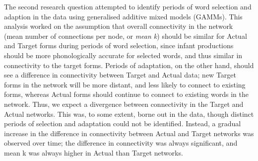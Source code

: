 \documentclass[
  man]{apa6}
\begin{document}
The second research question attempted to identify periods of word selection and adaption in the data using generalised additive mixed models (GAMMs). This analysis worked on the assumption that overall connectivity in the network (mean number of connections per node, or \emph{mean k}) should be similar for Actual and Target forms during periods of word selection, since infant productions should be more phonologically accurate for selected words, and thus similar in connectivity to the target forms. Periods of adaptation, on the other hand, should see a difference in connectivity between Target and Actual data; new Target forms in the network will be more distant, and less likely to connect to existing forms, whereas Actual forms should continue to connect to existing words in the network. Thus, we expect a divergence between connectivity in the Target and Actual networks. This was, to some extent, borne out in the data, though distinct periods of selection and adaptation could not be identified. Instead, a gradual increase in the difference in connectivity between Actual and Target networks was observed over time; the difference in connectivity was always significant, and mean k was always higher in Actual than Target networks.
\end{document}

